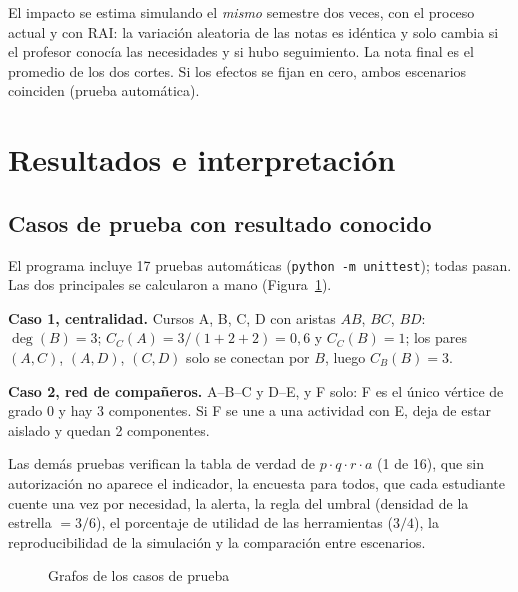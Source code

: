 \documentclass[12pt,letterpaper]{article}
\newcommand{\codigo}[1]{\texttt{#1}}
\begin{document}
El impacto se estima simulando el \emph{mismo} semestre dos veces, con el proceso actual y con RAI: la variación aleatoria de las notas es idéntica y solo cambia si el profesor conocía las necesidades y si hubo seguimiento. La nota final es el promedio de los dos cortes. Si los efectos se fijan en cero, ambos escenarios coinciden (prueba automática).

\section{Resultados e interpretación}\label{sec:resultados}

\subsection{Casos de prueba con resultado conocido}
El programa incluye 17 pruebas automáticas (\codigo{python -m unittest}); todas pasan. Las dos principales se calcularon a mano (Figura~\ref{fig:casos}).

\textbf{Caso 1, centralidad.} Cursos A, B, C, D con aristas $AB$, $BC$, $BD$: $\deg(B)=3$; $C_C(A)=3/(1+2+2)=0{,}6$ y $C_C(B)=1$; los pares $(A,C)$, $(A,D)$, $(C,D)$ solo se conectan por $B$, luego $C_B(B)=3$.

\textbf{Caso 2, red de compañeros.} A--B--C y D--E, y F solo: F es el único vértice de grado 0 y hay 3 componentes. Si F se une a una actividad con E, deja de estar aislado y quedan 2 componentes.

Las demás pruebas verifican la tabla de verdad de $p\cdot q\cdot r\cdot a$ (1 de 16), que sin autorización no aparece el indicador, la encuesta para todos, que cada estudiante cuente una vez por necesidad, la alerta, la regla del umbral (densidad de la estrella $=3/6$), el porcentaje de utilidad de las herramientas ($3/4$), la reproducibilidad de la simulación y la comparación entre escenarios.

\begin{figure}[H]
\centering
{}
\caption{Grafos de los casos de prueba}
\label{fig:casos}
\end{figure}
\end{document}
